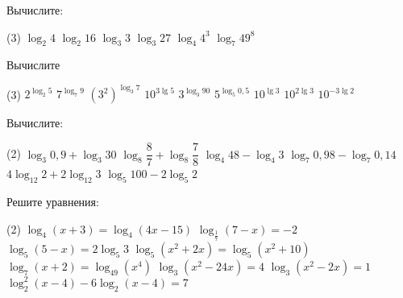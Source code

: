 \begin{homework}[number=1]
	\begin{listofex}
		\item Вычислите:
		\begin{tasks}(3)
			\task \( \log_2 4 \)
			\task \( \log_2 16 \)
			\task \( \log_3 3 \)
			\task \( \log_3 27 \)
			\task \( \log_4 4^3 \)
			\task \( \log_7 49^8 \)
		\end{tasks}
		\item Вычислите
		\begin{tasks}(3)
			\task \( 2^{\log_2 5} \)
			\task \( 7^{\log_7 9} \)
			\task \( (3^2)^{\log_3 7} \)
			\task \( 10^{3\lg 5} \)
			\task \( 3^{\log_3 90} \)
			\task \( 5^{\log_5 0,5} \)
			\task \( 10^{\lg 3} \)
			\task \( 10^{2\lg 3} \)
			\task \( 10^{-3\lg 2} \)
			\end{tasks}
		\item Вычислите:
		\begin{tasks}(2)
			\task \( \log_3 0,9 + \log_3 30 \)
			\task \( \log_8 \dfrac{8}{7} + \log_8 \dfrac{7}{8} \)
			\task \( \log_4 48 - \log_4 3 \)
			\task \( \log_7 0,98 - \log_7 0,14 \)
			\task \( 4\log_{12} 2 + 2\log_{12} 3 \)
			\task \( \log_5 100 - 2 \log_5 2 \)
		\end{tasks}
		\item Решите уравнения: %
		\begin{tasks}(2)
			\task \( \log_4 (x+3) = \log_4 (4x-15) \)
			\task \( \log_{\tfrac{1}{7}}(7-x) = -2 \)
			\task \( \log_5 (5-x) = 2 \log_5 3 \)
			\task \( \log_5 (x^2+2x) = \log_5 (x^2+10) \)
			\task \( \log_7 (x+2) = \log_{49} (x^4) \)
			\task \( \log_3 (x^2-24x)=4 \)
			\task \( \log_3 (x^2-2x)=1 \)
			\task \( \log_2^2 (x-4) -6 \log_2 (x-4) = 7 \)
		\end{tasks}
	\end{listofex}
\end{homework}

